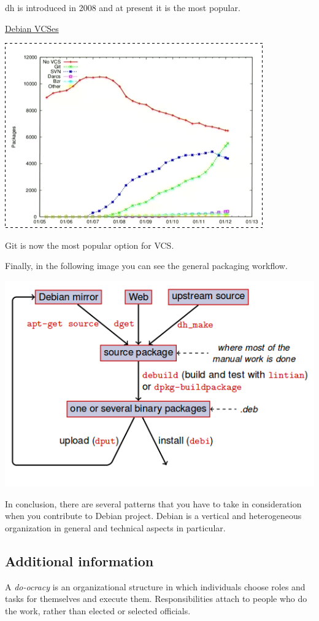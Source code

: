 \documentclass[11pt]{article}
\begin{document}
dh is introduced in 2008 and at present it is the most popular.

\underline{Debian VCSes}

\includegraphics[scale=0.7]{img/VCSes}

Git is now the most popular option for VCS.

Finally, in the following image you can see the general packaging workflow.

\hfill\includegraphics[scale=0.5]{img/generalPackagingWorkflow}\hspace*{\fill}

In conclusion, there are several patterns that you have to take in consideration when you contribute to Debian project. Debian is a vertical and heterogeneous organization in general and technical aspects in particular.

\subsection{Additional information}
A \emph{do-ocracy} is an organizational structure in which individuals choose roles and tasks for themselves and execute them. Responsibilities attach to people who do the work, rather than elected or selected officials.
\end{document}
